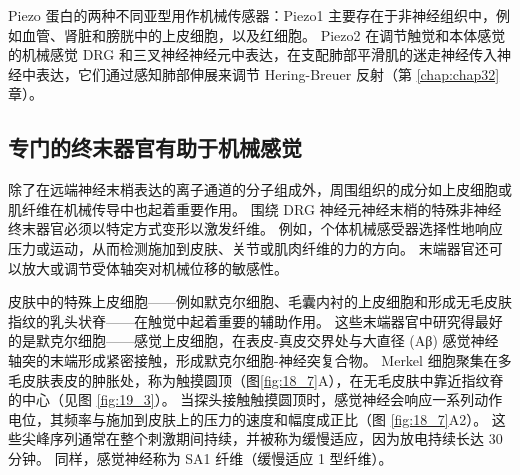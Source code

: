 Piezo 蛋白的两种不同亚型用作机械传感器：Piezo1 主要存在于非神经组织中，例如血管、肾脏和膀胱中的上皮细胞，以及红细胞。 
Piezo2 在调节触觉和本体感觉的机械感觉 DRG 和三叉神经神经元中表达，在支配肺部平滑肌的迷走神经传入神经中表达，它们通过感知肺部伸展来调节 Hering-Breuer 反射（第 \ref{chap:chap32} 章）。


\subsection{专门的终末器官有助于机械感觉}
除了在远端神经末梢表达的离子通道的分子组成外，周围组织的成分如上皮细胞或肌纤维在机械传导中也起着重要作用。 
围绕 DRG 神经元神经末梢的特殊非神经终末器官必须以特定方式变形以激发纤维。 
例如，个体机械感受器选择性地响应压力或运动，从而检测施加到皮肤、关节或肌肉纤维的力的方向。 
末端器官还可以放大或调节受体轴突对机械位移的敏感性。


皮肤中的特殊上皮细胞——例如默克尔细胞、毛囊内衬的上皮细胞和形成无毛皮肤指纹的乳头状脊——在触觉中起着重要的辅助作用。 
这些末端器官中研究得最好的是默克尔细胞——感觉上皮细胞，在表皮-真皮交界处与大直径 (Aβ) 感觉神经轴突的末端形成紧密接触，形成默克尔细胞-神经突复合物。 
Merkel 细胞聚集在多毛皮肤表皮的肿胀处，称为触摸圆顶（图\ref{fig:18_7}A），在无毛皮肤中靠近指纹脊的中心（见图 \ref{fig:19_3}）。 
当探头接触触摸圆顶时，感觉神经会响应一系列动作电位，其频率与施加到皮肤上的压力的速度和幅度成正比（图 \ref{fig:18_7}A2）。 
这些尖峰序列通常在整个刺激期间持续，并被称为缓慢适应，因为放电持续长达 30 分钟。 
同样，感觉神经称为 SA1 纤维（缓慢适应 1 型纤维）。

